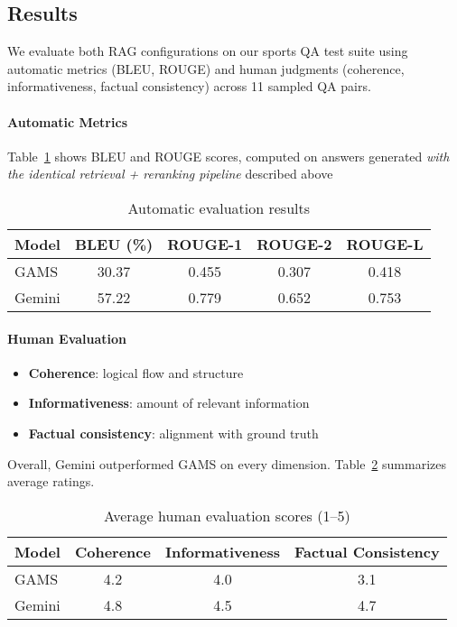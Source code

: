 \documentclass[fleqn,moreauthors,10pt]{ds_report}
\begin{document}

\subsection*{Results}

We evaluate both RAG configurations on our sports QA test suite using automatic metrics (BLEU, ROUGE) and human judgments (coherence, informativeness, factual consistency) across 11 sampled QA pairs.

\paragraph{Automatic Metrics}
Table~\ref{tab:auto-metrics} shows BLEU and ROUGE scores, computed on answers generated \emph{with the identical retrieval + reranking pipeline} described above

\begin{table}[h]
  \centering
  \small
  \caption{Automatic evaluation results}
  \label{tab:auto-metrics}
  \begin{tabular}{lcccc}
    \toprule
    Model   & BLEU (\%) & ROUGE-1 & ROUGE-2 & ROUGE-L \\
    \midrule
    GAMS    & 30.37     & 0.455   & 0.307   & 0.418   \\
    Gemini  & 57.22     & 0.779   & 0.652   & 0.753   \\
    \bottomrule
  \end{tabular}
\end{table}

\paragraph{Human Evaluation}
\begin{itemize}
  \item \textbf{Coherence}: logical flow and structure
  \item \textbf{Informativeness}: amount of relevant information
  \item \textbf{Factual consistency}: alignment with ground truth
\end{itemize}
Overall, Gemini outperformed GAMS on every dimension. Table~\ref{tab:human-summary} summarizes average ratings.

\begin{table}[h]
  \centering
  \small
  \caption{Average human evaluation scores (1–5)}
  \label{tab:human-summary}
  \begin{tabular}{lccc}
    \toprule
    Model   & Coherence & Informativeness & Factual Consistency \\
    \midrule
    GAMS    & 4.2       & 4.0             & 3.1                 \\
    Gemini  & 4.8       & 4.5             & 4.7                 \\
    \bottomrule
  \end{tabular}
\end{table}
\end{document}

